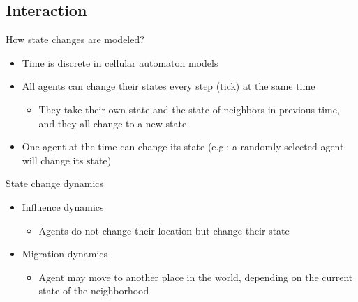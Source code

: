 \documentclass{beamer}
\begin{document}
\subsection{Interaction}
\begin{frame}{How state changes are modeled?}
\begin{itemize}
  \item Time is discrete in cellular automaton models
  \item All agents can change their states every step (tick) at the same time
  \begin{itemize}
    \item They take their own state and the state of neighbors in previous time, and they all change to a new state
  \end{itemize}
  \item One agent at the time can change its state (e.g.: a randomly selected agent will change its state)
\end{itemize}
\end{frame}

\begin{frame}{State change dynamics}
\begin{itemize}
  \item Influence dynamics
  \begin{itemize}
    \item Agents do not change their location but change their state
  \end{itemize}
  \item Migration dynamics
  \begin{itemize}
  \item Agent may move to another place in the world, depending on the current state of the neighborhood
  \end{itemize}
\end{itemize}
\end{frame}
\end{document}
